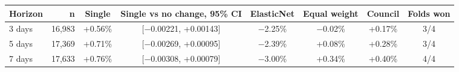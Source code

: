 \renewcommand{\arraystretch}{1.25}
\footnotesize
\begin{tabular}{|l|r|c|c|c|c|c|c|}
\hline
\textbf{Horizon} & \textbf{n} & \textbf{Single} & \textbf{Single vs no change, 95\% CI} & \textbf{ElasticNet} & \textbf{Equal weight} & \textbf{Council} & \textbf{Folds won} \\
\hline
3 days & 16,983 & +0.56\% & [$-$0.00221, +0.00143] & $-$2.25\% & $-$0.02\% & +0.17\% & 3/4 \\
\hline
5 days & 17,369 & +0.71\% & [$-$0.00269, +0.00095] & $-$2.39\% & +0.08\% & +0.28\% & 3/4 \\
\hline
7 days & 17,633 & +0.76\% & [$-$0.00308, +0.00079] & $-$3.00\% & +0.34\% & +0.40\% & 4/4 \\
\hline
\end{tabular}
